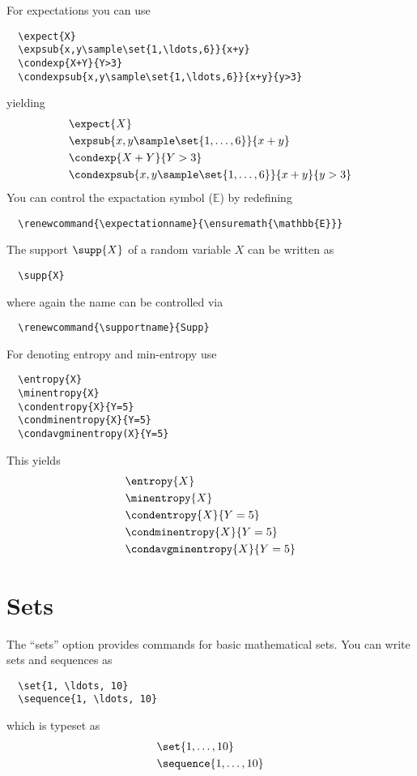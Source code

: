 \documentclass[a4paper]{report}
\begin{document}
  For expectations you can use
  \begin{lstlisting}
  \expect{X}
  \expsub{x,y\sample\set{1,\ldots,6}}{x+y}
  \condexp{X+Y}{Y>3}
  \condexpsub{x,y\sample\set{1,\ldots,6}}{x+y}{y>3}
  \end{lstlisting}
  yielding
  \begin{align*}
  & \expect{X} \\
  & \expsub{x,y\sample\set{1,\ldots,6}}{x+y} \\
  & \condexp{X+Y}{Y>3} \\
  & \condexpsub{x,y\sample\set{1,\ldots,6}}{x+y}{y>3} 
  \end{align*}
  You can control the expactation symbol ($\mathbb{E}$) by redefining
  \begin{lstlisting}
  \renewcommand{\expectationname}{\ensuremath{\mathbb{E}}}
  \end{lstlisting}
  
  The support $\supp{X}$ of a random variable $X$ can be written as
  \begin{lstlisting}
  \supp{X}
  \end{lstlisting}
  where again the name can be controlled via
  \begin{lstlisting}
  \renewcommand{\supportname}{Supp}
  \end{lstlisting}
  
  For denoting entropy and min-entropy use
  \begin{lstlisting}
  \entropy{X}
  \minentropy{X}
  \condentropy{X}{Y=5}
  \condminentropy{X}{Y=5}
  \condavgminentropy(X}{Y=5}
  \end{lstlisting}
  This yields 
  \begin{align*}
  & \entropy{X} \\
  & \minentropy{X} \\
  & \condentropy{X}{Y=5} \\
  & \condminentropy{X}{Y=5} \\
  & \condavgminentropy{X}{Y=5}
  \end{align*}
  
  \section{Sets}
  The \enquote{sets} option provides commands for basic mathematical sets.
  You can write sets and sequences as
  \begin{lstlisting}
  \set{1, \ldots, 10}
  \sequence{1, \ldots, 10}
  \end{lstlisting}
  which is typeset as
  \begin{align*}
  & \set{1, \ldots, 10} \\
  & \sequence{1, \ldots, 10}
  \end{align*}
  
\end{document}
